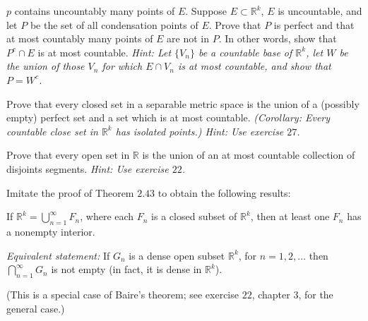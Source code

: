 \begin{exercise}
  \(p\) contains uncountably many points of \(E\).
  Suppose \(E\subset\mathbb{R}^k\), \(E\) is uncountable, and let \(P\) be the
  set of all condensation points of \(E\).
  Prove that \(P\) is perfect and that at most countably many points of \(E\)
  are not in \(P\).
  In other words, show that \(P^c\cap E\) is at most countable.
  \textit{Hint: Let \(\{V_n\}\) be a countable base of \(\mathbb{R}^k\), let
    \(W\) be the union of those \(V_n\) for which \(E\cap V_n\) is at most
    countable, and show that \(P = W^c\).}
\item
  Prove that every closed set in a separable metric space is the union of a
  (possibly empty) perfect set and a set which is at most countable.
  \textit{(Corollary: Every countable close set in \(\mathbb{R}^k\) has
    isolated points.)
    Hint: Use exercise \(27\).}
\item
  \label{2.29}
  Prove that every open set in \(\mathbb{R}\) is the union of an at most
  countable collection of disjoints segments.
  \textit{Hint: Use exercise \(22\).}
\item
  Imitate the proof of Theorem \(2.43\) to obtain the following results:
  \par\smallskip
  If \(\mathbb{R}^k = \bigcup_{n = 1}^{\infty}F_n\), where each \(F_n\) is a
  closed subset of \(\mathbb{R}^k\), then at least one \(F_n\) has a nonempty
  interior.
  \par\smallskip
  \textit{Equivalent statement:} If \(G_n\) is a dense open subset
  \(\mathbb{R}^k\), for \(n = 1,2,\ldots\) then
  \(\bigcap_{n = 1}^{\infty}G_n\) is not empty (in fact, it is dense in
  \(\mathbb{R}^k\)).
  \par\smallskip
  (This is a special case of Baire's theorem; see exercise \(22\), chapter
  \(3\), for the general case.)
\end{exercise}

